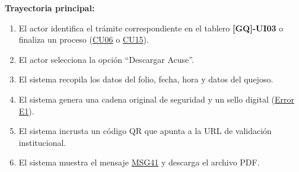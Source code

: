 \begin{appendices}
\textbf{Trayectoria principal:}
\begin{enumerate}[nosep]
    \item El actor identifica el trámite correspondiente en el tablero \textbf{[GQ]-UI03} o finaliza un proceso (\hyperlink{anexo:casos_uso}{CU06} o \hyperlink{anexo:casos_uso}{CU15}).
    \item El actor selecciona la opción ``Descargar Acuse''.
    \item El sistema recopila los datos del folio, fecha, hora y datos del quejoso.
    \item El sistema genera una cadena original de seguridad y un sello digital (\hyperlink{err:E22}{Error E1}).
    \item El sistema incrusta un código QR que apunta a la URL de validación institucional.
    \item El sistema muestra el mensaje \hyperlink{msg:MSG41}{MSG41} y descarga el archivo PDF.
\end{enumerate}




































































\end{appendices}